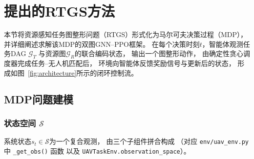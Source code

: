 
\section{提出的RTGS方法}
\label{sec:method}

本节将资源感知任务图整形问题（RTGS）形式化为马尔可夫决策过程（MDP），
并详细阐述求解该MDP的双图GNN–PPO框架。
在每个决策时刻$t$，智能体观测任务DAG $\mathcal{G}_T$
与资源图$\mathcal{G}_R$的联合编码状态，
输出一个图整形动作，
由确定性贪心调度器完成任务–无人机匹配后，
环境向智能体反馈奖励信号与更新后的状态，
形成如图~\ref{fig:architecture}所示的闭环控制流。

\subsection{MDP问题建模}
\label{subsec:mdp}

\subsubsection*{状态空间 $\mathcal{S}$}

系统状态$s_t \in \mathcal{S}$为一个复合观测，
由三个子组件拼合构成
（对应 \texttt{env/uav\_env.py} 中 \texttt{\_get\_obs()} 函数
以及 \texttt{UAVTaskEnv.observation\_space}）。


